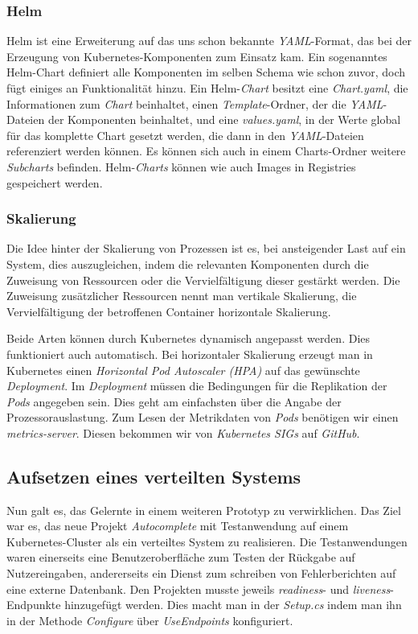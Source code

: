 \documentclass[12pt,a4paper]{scrartcl}
\begin{document}
\subsubsection{Helm}

Helm ist eine Erweiterung auf das uns schon bekannte \emph{YAML}-Format, das bei der Erzeugung von Kubernetes-Komponenten zum Einsatz kam. Ein sogenanntes Helm-Chart definiert alle Komponenten im selben Schema wie schon zuvor, doch fügt einiges an Funktionalität hinzu. Ein Helm-\emph{Chart} besitzt eine \emph{Chart.yaml}, die Informationen zum \emph{Chart} beinhaltet, einen \emph{Template}-Ordner, der die \emph{YAML}-Dateien der Komponenten beinhaltet, und eine \emph{values.yaml}, in der Werte global für das komplette Chart gesetzt werden, die dann in den \emph{YAML}-Dateien referenziert werden können. Es können sich auch in einem Charts-Ordner weitere \emph{Subcharts} befinden. Helm-\emph{Charts} können wie auch Images in Registries gespeichert werden.

\subsubsection{Skalierung} 

Die Idee hinter der Skalierung von Prozessen ist es, bei ansteigender Last auf ein System, dies auszugleichen, indem die relevanten Komponenten durch die Zuweisung von Ressourcen oder die Vervielfältigung dieser gestärkt werden.
Die Zuweisung zusätzlicher Ressourcen nennt man vertikale Skalierung, die Vervielfältigung der betroffenen Container horizontale Skalierung.

Beide Arten können durch Kubernetes dynamisch angepasst werden. Dies funktioniert auch automatisch. Bei horizontaler Skalierung erzeugt man in Kubernetes einen \emph{Horizontal Pod Autoscaler (HPA)} auf das gewünschte \emph{Deployment}. Im \emph{Deployment} müssen die Bedingungen für die Replikation der \emph{Pods} angegeben sein. Dies geht am einfachsten über die Angabe der Prozessorauslastung. Zum Lesen der Metrikdaten von \emph{Pods} benötigen wir einen \emph{metrics-server}. Diesen bekommen wir von \emph{Kubernetes SIGs} auf \emph{GitHub}.

\subsection{Aufsetzen eines verteilten Systems}

Nun galt es, das Gelernte in einem weiteren Prototyp zu verwirklichen. Das Ziel war es, das neue Projekt \emph{Autocomplete} mit Testanwendung auf einem Kubernetes-Cluster als ein verteiltes System zu realisieren. Die Testanwendungen waren einerseits eine Benutzeroberfläche zum Testen der Rückgabe auf Nutzereingaben, andererseits ein Dienst zum schreiben von Fehlerberichten auf eine externe Datenbank.
Den Projekten musste jeweils \emph{readiness}- und \emph{liveness}-Endpunkte hinzugefügt werden. Dies macht man in der \emph{Setup.cs} indem man ihn in der Methode \emph{Configure} über \emph{UseEndpoints} konfiguriert. 
\end{document}

